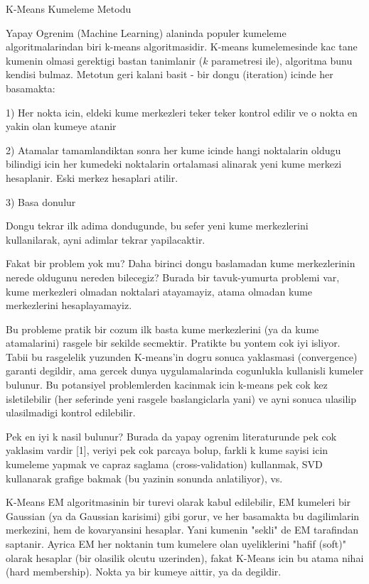 \documentclass[12pt,fleqn]{article}\usepackage{../common}
\begin{document}
K-Means Kumeleme Metodu

Yapay Ogrenim (Machine Learning) alaninda populer kumeleme
algoritmalarindan biri k-means algoritmasidir. K-means kumelemesinde kac
tane kumenin olmasi gerektigi bastan tanimlanir ($k$ parametresi ile),
algoritma bunu kendisi bulmaz. Metotun geri kalani basit - bir dongu
(iteration) icinde her basamakta:

1) Her nokta icin, eldeki kume merkezleri teker teker kontrol edilir
ve o nokta en yakin olan kumeye atanir

2) Atamalar tamamlandiktan sonra her kume icinde hangi noktalarin
oldugu bilindigi icin her kumedeki noktalarin ortalamasi alinarak yeni
kume merkezi hesaplanir. Eski merkez hesaplari atilir.

3) Basa donulur

Dongu tekrar ilk adima dondugunde, bu sefer yeni kume merkezlerini
kullanilarak, ayni adimlar tekrar yapilacaktir.

Fakat bir problem yok mu? Daha birinci dongu baslamadan kume
merkezlerinin nerede oldugunu nereden bilecegiz? Burada bir
tavuk-yumurta problemi var, kume merkezleri olmadan noktalari
atayamayiz, atama olmadan kume merkezlerini hesaplayamayiz.

Bu probleme pratik bir cozum ilk basta kume merkezlerini (ya da kume
atamalarini) rasgele bir sekilde secmektir. Pratikte bu yontem cok iyi
isliyor. Tabii bu rasgelelik yuzunden K-means'in dogru sonuca
yaklasmasi (convergence) garanti degildir, ama gercek dunya
uygulamalarinda cogunlukla kullanisli kumeler bulunur. Bu potansiyel
problemlerden kacinmak icin k-means pek cok kez isletilebilir (her
seferinde yeni rasgele baslangiclarla yani) ve ayni sonuca ulasilip
ulasilmadigi kontrol edilebilir.

Pek en iyi k nasil bulunur? Burada da yapay ogrenim literaturunde pek
cok yaklasim vardir [1], veriyi pek cok parcaya bolup, farkli k kume
sayisi icin kumeleme yapmak ve capraz saglama (cross-validation)
kullanmak, SVD kullanarak grafige bakmak (bu yazinin sonunda
anlatiliyor), vs.

K-Means EM algoritmasinin bir turevi olarak kabul edilebilir, EM
kumeleri bir Gaussian (ya da Gaussian karisimi) gibi gorur, ve her
basamakta bu dagilimlarin merkezini, hem de kovaryansini
hesaplar. Yani kumenin "sekli" de EM tarafindan saptanir. Ayrica EM
her noktanin tum kumelere olan uyeliklerini "hafif (soft)" olarak
hesaplar (bir olasilik olcutu uzerinden), fakat K-Means icin bu atama
nihai (hard membership). Nokta ya bir kumeye aittir, ya da
degildir.
\end{document}
